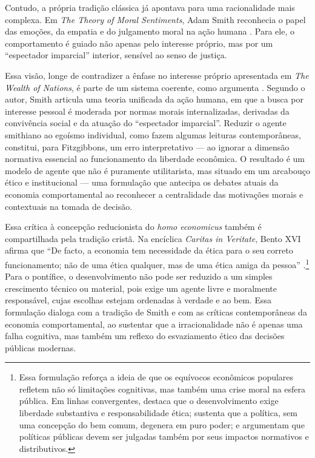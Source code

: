 Contudo, a própria tradição clássica já apontava para uma racionalidade mais complexa. Em \textit{The Theory of Moral Sentiments}, Adam Smith reconhecia o papel das emoções, da empatia e do julgamento moral na ação humana \cite{smith1759-theory-of-moral-sentiments}. Para ele, o comportamento é guiado não apenas pelo interesse próprio, mas por um ``espectador imparcial'' interior, sensível ao senso de justiça.

Essa visão, longe de contradizer a ênfase no interesse próprio apresentada em \textit{The Wealth of Nations}, é parte de um sistema coerente, como argumenta . Segundo o autor, Smith articula uma teoria unificada da ação humana, em que a busca por interesse pessoal é moderada por normas morais internalizadas, derivadas da convivência social e da atuação do ``espectador imparcial''. Reduzir o agente smithiano ao egoísmo individual, como fazem algumas leituras contemporâneas, constitui, para Fitzgibbons, um erro interpretativo — ao ignorar a dimensão normativa essencial ao funcionamento da liberdade econômica. O resultado é um modelo de agente que não é puramente utilitarista, mas situado em um arcabouço ético e institucional — uma formulação que antecipa os debates atuais da economia comportamental ao reconhecer a centralidade das motivações morais e contextuais na tomada de decisão.

Essa crítica à concepção reducionista do \textit{homo economicus} também é compartilhada pela tradição cristã. Na encíclica \textit{Caritas in Veritate}, Bento XVI afirma que ``De facto, a economia tem necessidade da ética para o seu correto funcionamento; não de uma ética qualquer, mas de uma ética amiga da pessoa'' \cite[\S~45]{bento2009caritas}.\footnote{Essa formulação reforça a ideia de que os equívocos econômicos populares refletem não só limitações cognitivas, mas também uma crise moral na esfera pública. Em linhas convergentes,  destaca que o desenvolvimento exige liberdade substantiva e responsabilidade ética;  sustenta que a política, sem uma concepção do bem comum, degenera em puro poder; e  argumentam que políticas públicas devem ser julgadas também por seus impactos normativos e distributivos.} Para o pontífice, o desenvolvimento não pode ser reduzido a um simples crescimento técnico ou material, pois exige um agente livre e moralmente responsável, cujas escolhas estejam ordenadas à verdade e ao bem. Essa formulação dialoga com a tradição de Smith e com as críticas contemporâneas da economia comportamental, ao sustentar que a irracionalidade não é apenas uma falha cognitiva, mas também um reflexo do esvaziamento ético das decisões públicas modernas.

